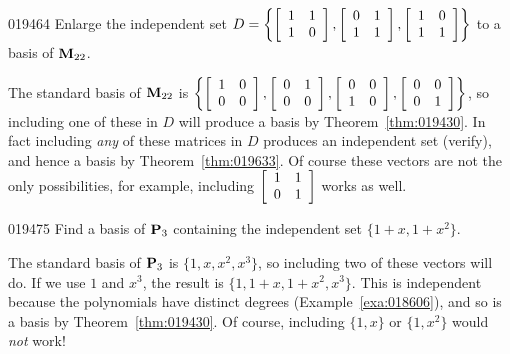 \begin{example}{}{019464}
Enlarge the independent set 
$D = \left\{
\left[ \begin{array}{rr}
1 & 1 \\
1 & 0
\end{array} \right], \left[ \begin{array}{rr}
0 & 1 \\
1 & 1
\end{array} \right], \left[ \begin{array}{rr}
1 & 0 \\
1 & 1
\end{array} \right]
\right\}$ to a basis of $\textbf{M}_{22}$.

\begin{solution}
The standard basis of $\textbf{M}_{22}$ is 
$\left\{
\left[ \begin{array}{rr}
1 & 0 \\
0 & 0  
\end{array} \right], \left[ \begin{array}{rr}
0 & 1 \\
0 & 0
\end{array} \right], \left[ \begin{array}{rr}
0 & 0 \\
1 & 0
\end{array} \right], \left[ \begin{array}{rr}
0 & 0 \\
0 & 1
\end{array} \right]
\right\}$, so including one of these in $D$ will produce a basis by Theorem~\ref{thm:019430}. In fact including \textit{any} of these matrices in $D$ produces an independent set (verify), and hence a basis by Theorem~\ref{thm:019633}. Of course these vectors are not the only possibilities, for example, including $\left[ \begin{array}{rr}
1 & 1 \\
0 & 1
\end{array} \right]$ works as well.
\end{solution}
\end{example}

\begin{example}{}{019475}
Find a basis of $\textbf{P}_{3}$ containing the independent set $\{1 + x, 1 + x^{2}\}$.

\begin{solution}
The standard basis of $\textbf{P}_{3}$ is $\{1, x, x^{2}, x^{3}\}$, so including two of these vectors will do. If we use $1$ and $x^{3}$, the result is $\{1, 1 + x, 1 + x^{2}, x^{3}\}$. This is independent because the polynomials have distinct degrees (Example~\ref{exa:018606}), and so is a basis by Theorem~\ref{thm:019430}. Of course, including $\{1, x\}$ or $\{1, x^{2}\}$ would \textit{not} work!
\end{solution}
\end{example}

